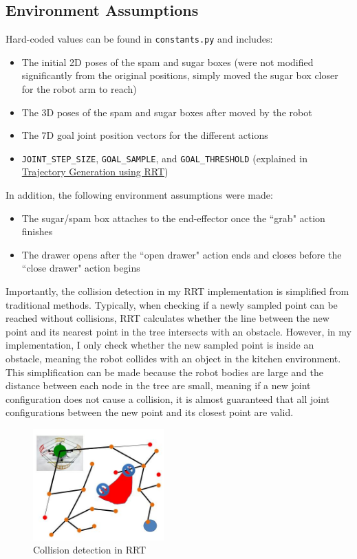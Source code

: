 \documentclass{article}
\begin{document}
\subsection{Environment Assumptions}

Hard-coded values can be found in \texttt{constants.py} and includes:
\begin{itemize}
    \item The initial 2D poses of the spam and sugar boxes (were not modified significantly from the original positions, simply moved the sugar box closer for the robot arm to reach)
    \item The 3D poses of the spam and sugar boxes after moved by the robot
    \item The 7D goal joint position vectors for the different actions
    \item \texttt{JOINT\_STEP\_SIZE}, \texttt{GOAL\_SAMPLE}, and \texttt{GOAL\_THRESHOLD} (explained in \href{sec:rrt}{Trajectory Generation using RRT})
\end{itemize}

In addition, the following environment assumptions were made:
\begin{itemize}
    \item The sugar/spam box attaches to the end-effector once the ``grab" action finishes
    \item The drawer opens after the ``open drawer" action ends and closes before the ``close drawer" action begins
\end{itemize}

Importantly, the collision detection in my RRT implementation is simplified from traditional methods. Typically, when checking if a newly sampled point can be reached without collisions, RRT calculates whether the line between the new point and its nearest point in the tree intersects with an obstacle. However, in my implementation, I only check whether the new sampled point is inside an obstacle, meaning the robot collides with an object in the kitchen environment. This simplification can be made because the robot bodies are large and the distance between each node in the tree are small, meaning if a new joint configuration does not cause a collision, it is almost guaranteed that all joint configurations between the new point and its closest point are valid.

\begin{figure}[h]
    \centering
    \includegraphics[width=190px]{rrt_collision.jpg}
    \caption{Collision detection in RRT}
    \label{fig:rrt_collision}
\end{figure}
\end{document}
